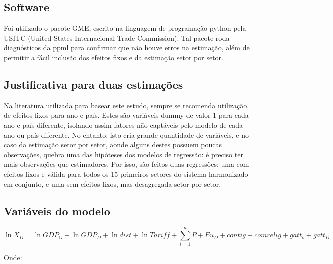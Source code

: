 \documentclass[12pt, a4paper]{article}
\begin{document}
\subsection{Software}
Foi utilizado o pacote GME, escrito na linguagem de programação python pela USITC (United States Internacional Trade Commission). Tal pacote roda diagnósticos da ppml para confirmar que não houve erros na estimação, além de permitir a fácil inclusão dos efeitos fixos e da estimação setor por setor.

\subsection{Justificativa para duas estimações}

Na literatura utilizada para basear este estudo, sempre se recomenda utilização de efeitos fixos para ano e país. Estes são variáveis dummy de valor 1 para cada ano e país diferente, isolando assim fatores não captáveis pelo modelo de cada ano ou país diferente. No entanto, isto cria grande quantidade de variáveis, e no caso da estimação setor por setor, aonde alguns destes possuem poucas observações, quebra uma das hipóteses dos modelos de regressão: é preciso ter mais observações que estimadores. Por isso, são feitos duas regressões: uma com efeitos fixos e válida para todos os 15 primeiros setores do sistema harmonizado em conjunto, e uma sem efeitos fixos, mas desagregada setor por setor.

\subsection{Variáveis do modelo}

\begin{equation}
    \ln X_{D} = 
    \ln GDP_{O} 
    + \ln GDP_{D} 
    + \ln dist 
    + \ln Tariff 
    + \sum_{i=1}^{n} P 
    + Eu_{D} 
    + contig 
    + comrelig
    + gatt_o 
    + gatt_D
\end{equation}

Onde:
\end{document}
